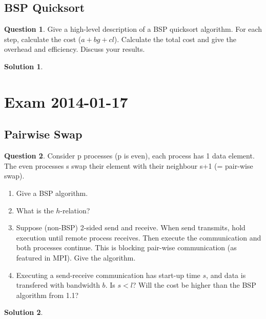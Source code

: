 \documentclass[a4paper, 10pt, oneside]{article}
\theoremstyle{definition}
\newtheorem*{question}{Question}
\newtheorem*{solution}{Solution}
\begin{document}
\subsection{BSP Quicksort}
\begin{question}
Give a high-level description of a BSP quicksort algorithm. For each step, calculate the cost ($a + bg + cl$). Calculate the total cost and give the overhead and efficiency. Discuss your results.
\end{question}
\begin{solution}
\end{solution}

\section{Exam 2014-01-17}

\subsection{Pairwise Swap}
\begin{question}
Consider p processes (p is even), each process has 1 data element. The even processes s swap their element with their neighbour s+1 (= pair-wise swap).
\begin{enumerate}
	\item Give a BSP algorithm.
	\item What is the $h$-relation?
	\item Suppose (non-BSP) 2-sided send and receive. When send transmits, hold execution until remote process receives. Then execute the communication and both processes continue. This is blocking pair-wise communication (as featured in MPI). Give the algorithm.
	\item Executing a send-receive communication has start-up time $s$, and data is transfered with bandwidth $b$. Is $s < l$? Will the cost be higher than the BSP algorithm from 1.1?
\end{enumerate}
\end{question}
\begin{solution}
\end{solution}
\end{document}
